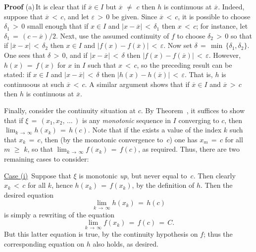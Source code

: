 {\V

        {\bf Proof} (a)\,It is clear that if $\overline{x}{\in}I$ but $\overline{x} \,\,{\neq}\,\, c$ then $h$ is continuous at $\overline{x}$.
    Indeed, suppose that $\overline{x}\,<\,c$, and let ${\varepsilon}\,>\,0$ be given.
    Since $\overline{x}\,<\,c$, it is possible to choose ${\delta}_{1}\,>\,0$ small enough that if $x{\in}I$ and $|x-\overline{x}|\,<\,{\delta}_{1}$ then $x\,<\,c$;
    for instance, let ${\delta}_{1} \,=\, (c-\overline{x})/2$.
    Next, use the assumed continuity of $f$ to choose ${\delta}_{2}\,>\,0$ so that if $|\overline{x}-x|\,<\,{\delta}_{2}$ then $x{\in}I$ and $|f(x)-f(\overline{x})|\,<\,{\varepsilon}$.
    Now set ${\delta} \,=\, {\min}\,\{{\delta}_{1},{\delta}_{2}\}$.
    One sees that ${\delta}\,>\,0$, and if $|x-\overline{x}|\,<\,{\delta}$ then $|f(x)-f(\overline{x})|\,<\,{\varepsilon}$.
    However, $h(x) \,=\, f(x)$ for $x$ in $I$ such that $x\,<\,c$, so the preceding result can be stated:
    if $x{\in}I$ and $|x-\overline{x}|\,<\,{\delta}$  then $|h(x)-h(\overline{x})|\,<\,{\varepsilon}$.
    That is, $h$ is continuoous at such $\overline{x}\,<\,c$.
    A similar argument shows that if $\overline{x}{\in}I$ and $\overline{x}\,>\,c$ then $h$ is continuous at $\overline{x}$.

        Finally, consider the continuity situation at $c$.
    By Theorem~, it suffices to show that if ${\xi} \,=\, (x_{1},x_{2},\,{\ldots}\,)$ is any {\em monotonic} sequence in $I$ converging to $c$,
    then $\lim_{k \,{\rightarrow}\, {\infty}}  h(x_{k}) \,=\, h(c)$. Note that if the exists a value of the index $k$ such that $x_{k} \,=\, c$,
    then (by the monotonic convergence to~$c$) one has $x_{m} \,=\, c$ for all $m\,\,{\geq}\,\,k$,
    so that $\lim_{k \,{\rightarrow}\, {\infty}} f(x_{k}) \,=\, f(c)$, as required.
    Thus, there are two remaining cases to consider:

        \h \underline{Case (i)}\, Suppose that ${\xi}$ is monotonic {\em up}, but never equal to~$c$.
    Then clearly $x_{k}\,<\,c$ for all $k$, hence $h(x_{k}) \,=\, f(x_{k})$, by the definition of $h$.
    Then the desired equation
        \begin{displaymath}
        \lim_{k \,{\rightarrow}\, {\infty}} h(x_{k}) \,=\, h(c)
        \end{displaymath}
    is simply a rewriting of the equation
        \begin{displaymath}
        \lim_{k \,{\rightarrow}\, {\infty}} f(x_{k}) \,=\, f(c) \,=\, C.
        \end{displaymath}
    But this latter equation is true, by the continuity hypothesis on $f$;
    thus the corresponding equation on $h$ also holds, as desired.

}
